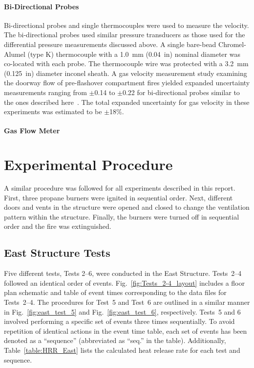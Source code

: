 \documentclass[12pt,oneside]{book}
\begin{document}
\subsubsection{Bi-Directional Probes}
Bi-directional probes and single thermocouples were used to measure the velocity. The bi-directional probes used similar pressure transducers as those used for the differential pressure measurements discussed above. A single bare-bead Chromel-Alumel (type K) thermocouple with a 1.0~mm (0.04~in) nominal diameter was co-located with each probe. The thermocouple wire was protected with a 3.2~mm (0.125~in) diameter inconel sheath. A gas velocity measurement study examining the doorway flow of pre-flashover compartment fires yielded expanded uncertainty measurements ranging from $\pm$0.14 to $\pm$0.22 for bi-directional probes similar to the ones described here~\cite{Bryant:FSJ2009}. The total expanded uncertainty for gas velocity in these experiments was estimated to be $\pm$18\%.

\subsubsection{Gas Flow Meter}

\clearpage

\chapter{Experimental Procedure}
\label{chap:Experimental_Procedure}
A similar procedure was followed for all experiments described in this report. First, three propane burners were ignited in sequential order. Next, different doors and vents in the structure were opened and closed to change the ventilation pattern within the structure. Finally, the burners were turned off in sequential order and the fire was extinguished.

\section{East Structure Tests}
\label{sec:east_procedure}
Five different tests, Tests 2--6, were conducted in the East Structure. Tests~2--4 followed an identical order of events. Fig.~\ref{fig:Tests_2-4_layout} includes a floor plan schematic and table of event times corresponding to the data files for Tests~2--4. The procedures for Test~5 and Test~6 are outlined in a similar manner in Fig.~\ref{fig:east_test_5} and Fig.~\ref{fig:east_test_6}, respectively. Tests~5 and 6 involved performing a specific set of events three times sequentially. To avoid repetition of identical actions in the event time table, each set of events has been denoted as a ``sequence'' (abbreviated as ``seq.'' in the table). Additionally, Table~\ref{table:HRR_East} lists the calculated heat release rate for each test and sequence.
\end{document}
